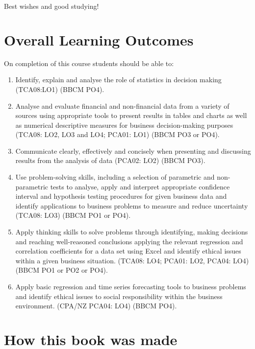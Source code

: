\documentclass[
  11pt,
  oneside]{scrbook}
\begin{document}
Best wishes and good studying!

\section*{Overall Learning Outcomes}\label{overall-learning-outcomes}

On completion of this course students should be able to:

\begin{enumerate}
\def\labelenumi{\arabic{enumi}.}
\item
  Identify, explain and analyse the role of statistics in decision making (TCA08:LO1) (BBCM PO4).
\item
  Analyse and evaluate financial and non-financial data from a variety of sources using appropriate tools to present results in tables and charts as well as numerical descriptive measures for business decision-making purposes (TCA08: LO2, LO3 and LO4; PCA01: LO1) (BBCM PO3 or PO4).
\item
  Communicate clearly, effectively and concisely when presenting and discussing results from the analysis of data (PCA02: LO2) (BBCM PO3).
\item
  Use problem-solving skills, including a selection of parametric and non-parametric tests to analyse, apply and interpret appropriate confidence interval and hypothesis testing procedures for given business data and identify applications to business problems to measure and reduce uncertainty (TCA08: LO3) (BBCM PO1 or PO4).
\item
  Apply thinking skills to solve problems through identifying, making decisions and reaching well-reasoned conclusions applying the relevant regression and correlation coefficients for a data set using Excel and identify ethical issues within a given business situation. (TCA08: LO4; PCA01: LO2, PCA04: LO4) (BBCM PO1 or PO2 or PO4).
\item
  Apply basic regression and time series forecasting tools to business problems and identify ethical issues to social responsibility within the business environment. (CPA/NZ PCA04: LO4) (BBCM PO4).
\end{enumerate}

\section*{How this book was made}\label{how-this-book-was-made}
\end{document}
